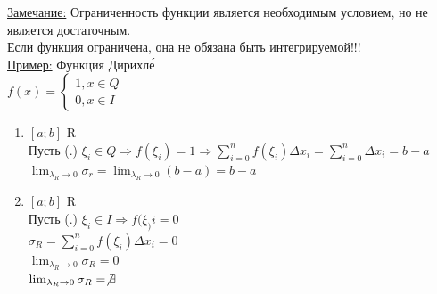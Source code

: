 \documentclass[12pt]{article}
\begin{document}
    \underline{Замечание:} Ограниченность функции является необходимым условием, но не является достаточным.\\
    \indent Если функция ограничена, она не обязана быть интегрируемой!!!\\
    \underline{Пример:} Функция Дирихле́\\
    $f(x) = \begin{cases}
        1,x \in Q\\
        0,x \in I
    \end{cases}$
    \begin{enumerate}
        \item $[a;b]$ R\\
        Пусть (.) $\xi_i \in Q \Rightarrow f(\xi_i) = 1 \Rightarrow \sum_{i=0}^{n} f(\xi_i) \Delta x_i =
        \sum_{i=0}^{n} \Delta x_i = b-a$\\
        $\lim_{\lambda_R \to 0} \sigma_r = \lim_{\lambda_R \to 0} (b-a) = b-a$
        \item $[a;b]$ R\\
        Пусть (.) $\xi_i \in I \Rightarrow f(\xi_)i=0$\\
        $\sigma_R = \sum_{i=0}^{n} f(\xi_i) \Delta x_i =0$\\
        $\lim_{\lambda_R \to 0} \sigma_R = 0$\\
        $\lim_{\lambda_R \to 0} \sigma_R = \not \exists$
    \end{enumerate}
\end{document}

